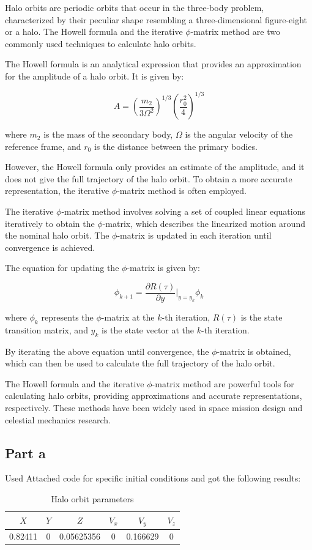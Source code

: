 Halo orbits are periodic orbits that occur in the three-body problem, characterized by their peculiar shape resembling a three-dimensional figure-eight or a halo. The Howell formula and the iterative $\phi$-matrix method are two commonly used techniques to calculate halo orbits.

The Howell formula is an analytical expression that provides an approximation for the amplitude of a halo orbit. It is given by:

\begin{equation}
A = \left(\frac{{m_2}}{{3\Omega^2}}\right)^{1/3}\left(\frac{{r_0^2}}{{4}}\right)^{1/3}
\end{equation}

where $m_2$ is the mass of the secondary body, $\Omega$ is the angular velocity of the reference frame, and $r_0$ is the distance between the primary bodies.

However, the Howell formula only provides an estimate of the amplitude, and it does not give the full trajectory of the halo orbit. To obtain a more accurate representation, the iterative $\phi$-matrix method is often employed.

The iterative $\phi$-matrix method involves solving a set of coupled linear equations iteratively to obtain the $\phi$-matrix, which describes the linearized motion around the nominal halo orbit. The $\phi$-matrix is updated in each iteration until convergence is achieved.

The equation for updating the $\phi$-matrix is given by:

\begin{equation}
\phi_{k+1} = \frac{{\partial R(\tau)}}{{\partial y}} \bigg|_{y=y_k} \phi_k
\end{equation}

where $\phi_k$ represents the $\phi$-matrix at the $k$-th iteration, $R(\tau)$ is the state transition matrix, and $y_k$ is the state vector at the $k$-th iteration.

By iterating the above equation until convergence, the $\phi$-matrix is obtained, which can then be used to calculate the full trajectory of the halo orbit.

The Howell formula and the iterative $\phi$-matrix method are powerful tools for calculating halo orbits, providing approximations and accurate representations, respectively. These methods have been widely used in space mission design and celestial mechanics research.
 \subsection{Part a}
 Used Attached code for specific initial conditions and got the following results:
 \begin{table}
        \centering
        \begin{tabular}{|c|c|c|c|c|c|}
            \hline
            $X$ & $Y$ & $Z$ & $V_x$ & $V_y$ & $V_z$ \\
            \hline
            0.82411 & 0 & 0.05625356 & 0 & 0.166629 & 0 \\
            \hline
        \end{tabular}
        \caption{Halo orbit parameters}
 \end{table}

